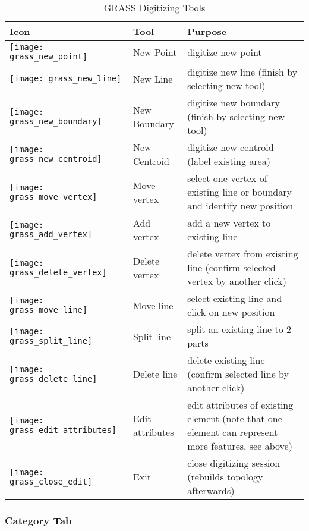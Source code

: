 \begin{table}[h]
\centering
\caption{GRASS Digitizing Tools}\label{tab:grass_tools}\medskip
 \begin{tabular}{|l|l|p{5in}|}
 \hline \textbf{Icon} & \textbf{Tool} & \textbf{Purpose} \\
\hline \texttt{[image: grass\_new\_point]} & New Point & digitize new point \\
\hline \texttt{[image: grass\_new\_line]} & New Line &  digitize new line (finish by selecting new tool) \\
\hline \texttt{[image: grass\_new\_boundary]} & New Boundary & digitize new boundary (finish by selecting new tool)\\
\hline \texttt{[image: grass\_new\_centroid]} & New Centroid & digitize new centroid (label existing area)\\
\hline \texttt{[image: grass\_move\_vertex]} & Move vertex & select one vertex of existing line or boundary and
identify new position\\
\hline \texttt{[image: grass\_add\_vertex]} & Add vertex & add a new vertex to existing line\\
\hline \texttt{[image: grass\_delete\_vertex]} & Delete vertex & delete vertex from existing line (confirm selected
vertex by another click)\\
\hline \texttt{[image: grass\_move\_line]} & Move line & select existing line and click on new position\\
\hline \texttt{[image: grass\_split\_line]} & Split line & split an existing line to 2 parts\\
\hline \texttt{[image: grass\_delete\_line]} & Delete line & delete existing line (confirm selected line by another
click)\\
\hline \texttt{[image: grass\_edit\_attributes]} & Edit attributes & edit attributes of existing element (note that one
element can represent more features, see above)\\
\hline \texttt{[image: grass\_close\_edit]} & Exit & close digitizing session (rebuilds topology afterwards)\\
\hline
\end{tabular}
\end{table}

\subsubsection{Category Tab}

